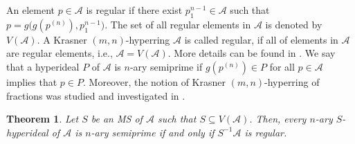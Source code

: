 \documentclass[preprint,review,10pt]{amsart}
\newtheorem{theorem}{Theorem}[section]
\theoremstyle{definition}
\theoremstyle{remark}
\numberwithin{equation}{section}
\begin{document}
An element $p \in \mathscr{A}$ is regular if there exist $p_1^{n-1} \in \mathscr{A}$ such that $p=g \big(g(p^{(n)}),p_1^{n-1}\big)$. The set of all regular elements in $\mathscr{A}$ is denoted by $V(\mathscr{A})$. A Krasner $(m,n)$-hyperring $\mathscr{A}$ is called regular, if all of elements
in $\mathscr{A}$ are regular elements,  i.e., $\mathscr{A}=V(\mathscr{A})$. More details can be found in \cite{Hila}. We say that a hyperideal $P$ of $\mathscr{A}$ is $n$-ary semiprime if $g(p^{(n)}) \in P$ for all $p \in \mathscr{A}$ implies that $p \in P$. Moreover, the notion of Krasner $(m,n)$-hyperring of fractions was studied and investigated in \cite{mah5}. 
\begin{theorem} \label{11}
Let $S$ be an MS of $\mathscr{A}$ such that $S \subseteq V(\mathscr{A})$. Then, every $n$-ary $S$-hyperideal of $\mathscr{A}$ is $n$-ary semiprime if and only if $S^{-1}\mathscr{A}$ is regular. 
\end{theorem}
\end{document}
